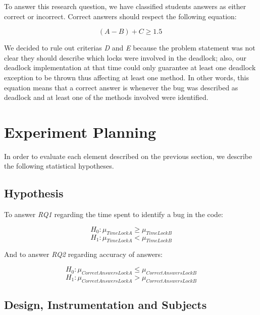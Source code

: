 To answer this research question, we have classified students answers as either correct or incorrect. Correct answers should respect the following equation:

\begin{equation}
  (A - B) + C \geq 1.5 \;
\end{equation}

We decided to rule out criterias \emph{D} and \emph{E} because the problem statement was not clear they should describe which locks were involved in the deadlock; also, our deadlock implementation at that time could only guarantee at least one deadlock exception to be thrown thus affecting at least one method. In other words, this equation means that a correct answer is whenever the bug was described as deadlock and at least one of the methods involved were identified.

\section{Experiment Planning}

In order to evaluate each element described on the previous section, we describe the following statistical hypotheses.

\subsection{Hypothesis}

To answer \emph{RQ1} regarding the time spent to identify a bug in the code:

\begin{equation}
  H_{0} : \mu_{TimeLockA} \geq \mu_{TimeLockB}
\end{equation}
\begin{equation}
  H_{1} : \mu_{TimeLockA} < \mu_{TimeLockB}
\end{equation}

And to answer \emph{RQ2} regarding accuracy of answers:

\begin{equation}
  H_{0} : \mu_{CorrectAnswersLockA} \leq \mu_{CorrectAnswersLockB}
\end{equation}
\begin{equation}
  H_{1} : \mu_{CorrectAnswersLockA} > \mu_{CorrectAnswersLockB}
\end{equation}

\subsection{Design, Instrumentation and Subjects}


